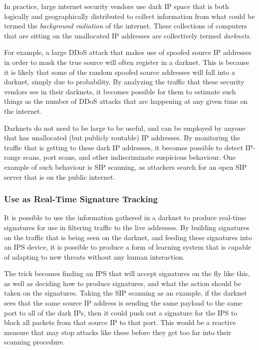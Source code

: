 \documentclass{article}
\theoremstyle{remark}
\theoremstyle{definition}
\theoremstyle{definition}
\theoremstyle{definition}
\begin{document}
In practice, large internet security vendors use dark IP space that is both logically and geographically distributed to collect information from what could be termed the \emph{background radiation} of the internet. These collections of computers that are sitting on the unallocated IP addresses are collectively termed \emph{darknets}. 

For example, a large DDoS attack that makes use of spoofed source IP addresses in order to mask the true source will often register in a darknet. This is because it is likely that some of the random spoofed source addresses will fall into a darknet, simply due to probability. By analyzing the traffic that these security vendors see in their darknets, it becomes possible for them to estimate such things as the number of DDoS attacks that are happening at any given time on the internet.

Darknets do not need to be large to be useful, and can be employed by anyone that has unallocated (but publicly routable) IP addresses. By monitoring the traffic that is getting to these dark IP addresses, it becomes possible to detect IP-range scans, port scans, and other indiscriminate suspicious behaviour. One example of such behaviour is SIP scanning, as attackers search for an open SIP server that is on the public internet.

\subsubsection{Use as Real-Time Signature Tracking}
It is possible to use the information gathered in a darknet to produce real-time signatures for use in filtering traffic to the live addresses. By building signatures on the traffic that is being seen on the darknet, and feeding these signatures into an IPS device, it is possible to produce a form of learning system that is capable of adapting to new threats without any human interaction.

The trick becomes finding an IPS that will accept signatures on the fly like this, as well as deciding how to produce signatures, and what the action should be taken on the signatures. Taking the SIP scanning as an example, if the darknet sees that the same source IP address is sending the same payload to the same port to all of the dark IPs, then it could push out a signature for the IPS to block all packets from that source IP to that port. This would be a reactive measure that may stop attacks like these before they get too far into their scanning procedure.
\end{document}
